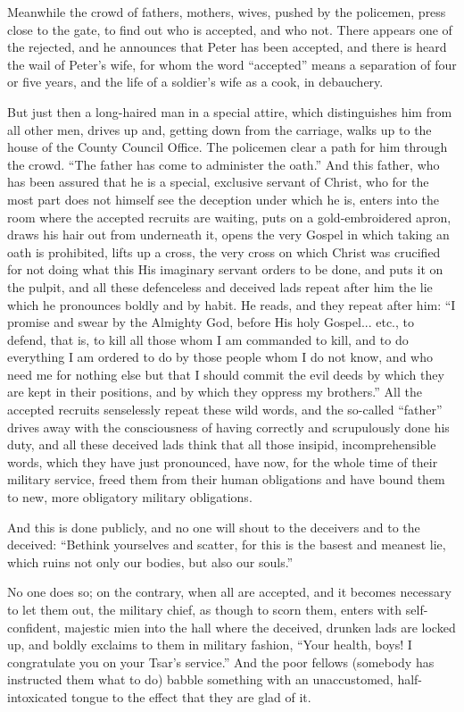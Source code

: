 \documentclass{book}
\begin{document}
Meanwhile the crowd of fathers, mothers, wives, pushed by the policemen, press close to the gate, to find out who is accepted, and who not. There appears one of the rejected, and he announces that Peter has been accepted, and there is heard the wail of Peter’s wife, for whom the word “accepted” means a separation of four or five years, and the life of a soldier’s wife as a cook, in debauchery.

But just then a long-haired man in a special attire, which distinguishes him from all other men, drives up and, getting down from the carriage, walks up to the house of the County Council Office. The policemen clear a path for him through the crowd. “The father has come to administer the oath.” And this father, who has been assured that he is a special, exclusive servant of Christ, who for the most part does not himself see the deception under which he is, enters into the room where the accepted recruits are waiting, puts on a gold-embroidered apron, draws his hair out from underneath it, opens the very Gospel in which taking an oath is prohibited, lifts up a cross, the very cross on which Christ was crucified for not doing what this His imaginary servant orders to be done, and puts it on the pulpit, and all these defenceless and deceived lads repeat after him the lie which he pronounces boldly and by habit. He reads, and they repeat after him: “I promise and swear by the Almighty God, before His holy Gospel... etc., to defend, that is, to kill all those whom I am commanded to kill, and to do everything I am ordered to do by those people whom I do not know, and who need me for nothing else but that I should commit the evil deeds by which they are kept in their positions, and by which they oppress my brothers.” All the accepted recruits senselessly repeat these wild words, and the so-called “father” drives away with the consciousness of having correctly and scrupulously done his duty, and all these deceived lads think that all those insipid, incomprehensible words, which they have just pronounced, have now, for the whole time of their military service, freed them from their human obligations and have bound them to new, more obligatory military obligations.

And this is done publicly, and no one will shout to the deceivers and to the deceived: “Bethink yourselves and scatter, for this is the basest and meanest lie, which ruins not only our bodies, but also our souls.”

No one does so; on the contrary, when all are accepted, and it becomes necessary to let them out, the military chief, as though to scorn them, enters with self-confident, majestic mien into the hall where the deceived, drunken lads are locked up, and boldly exclaims to them in military fashion, “Your health, boys! I congratulate you on your Tsar’s service.” And the poor fellows (somebody has instructed them what to do) babble something with an unaccustomed, half-intoxicated tongue to the effect that they are glad of it.
\end{document}
